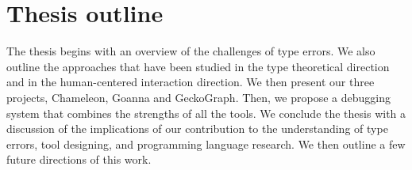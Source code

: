


\section{Thesis outline}

The thesis begins with an overview of the challenges of type errors. We also outline the approaches that have been studied in the type theoretical direction and in the human-centered interaction direction. We then present our three projects, Chameleon, Goanna and GeckoGraph. Then, we propose a debugging system that combines the strengths of all the tools. We conclude the thesis with a discussion of the implications of our contribution to the understanding of type errors, tool designing, and programming language research. We then outline a few future directions of this work.

